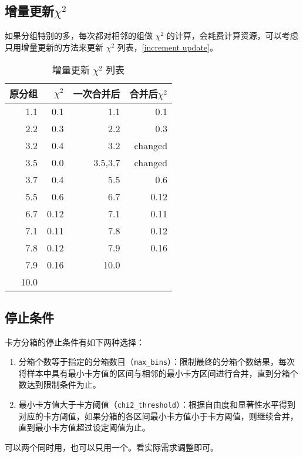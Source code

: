 \subsection{增量更新$\chi^2$}
如果分组特别的多，每次都对相邻的组做 $\chi^2$ 的计算，会耗费计算资源，可以考虑只用增量更新的方法来更新 $\chi^2$ 列表，\autoref{increment update}。
\begin{table}
    \centering
    \caption{增量更新 $\chi^2$ 列表}
    \label{increment update}
    \begin{tabular}{rrrr}
        \hline
        原分组  & $\chi^2$                     & 一次合并后   & 合并后$\chi^2$                     \\
        \hline
        1.1  & \cellcolor[HTML]{8EA9DB}0.1  & 1.1     & \cellcolor[HTML]{8EA9DB}0.1     \\
        2.2  & \cellcolor[HTML]{8EA9DB}0.3  & 2.2     & \cellcolor[HTML]{8EA9DB}0.3     \\
        3.2  & 0.4                          & 3.2     & \cellcolor[HTML]{FFC000}changed \\
        3.5  & 0.0                          & 3.5,3.7 & \cellcolor[HTML]{FFC000}changed \\
        3.7  & 0.4                          & 5.5     & \cellcolor[HTML]{8EA9DB}0.6     \\
        5.5  & \cellcolor[HTML]{8EA9DB}0.6  & 6.7     & \cellcolor[HTML]{8EA9DB}0.12    \\
        6.7  & \cellcolor[HTML]{8EA9DB}0.12 & 7.1     & \cellcolor[HTML]{8EA9DB}0.11    \\
        7.1  & \cellcolor[HTML]{8EA9DB}0.11 & 7.8     & \cellcolor[HTML]{8EA9DB}0.12    \\
        7.8  & \cellcolor[HTML]{8EA9DB}0.12 & 7.9     & \cellcolor[HTML]{8EA9DB}0.16    \\
        7.9  & \cellcolor[HTML]{8EA9DB}0.16 & 10.0    &                                 \\
        10.0 &                              &         &                                 \\
        \hline
    \end{tabular}
\end{table}

\subsection{停止条件}
卡方分箱的停止条件有如下两种选择：
\begin{enumerate}
    \item 分箱个数等于指定的分箱数目（\verb|max_bins|）：限制最终的分箱个数结果，每次将样本中具有最小卡方值的区间与相邻的最小卡方区间进行合并，直到分箱个数达到限制条件为止。
    \item 最小卡方值大于卡方阈值（\verb|chi2_threshold|）：根据自由度和显著性水平得到对应的卡方阈值，如果分箱的各区间最小卡方值小于卡方阈值，则继续合并，直到最小卡方值超过设定阈值为止。
\end{enumerate}
可以两个同时用，也可以只用一个。看实际需求调整即可。
